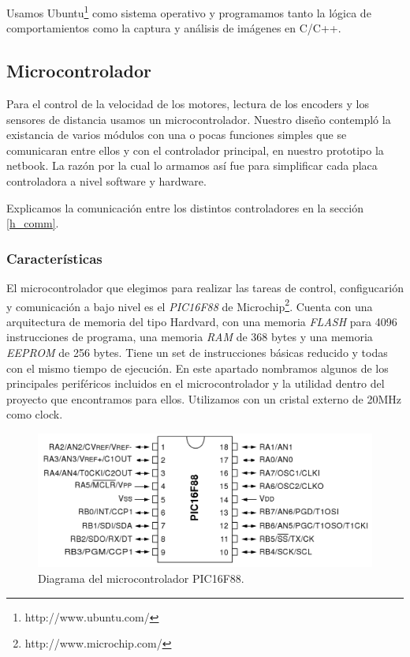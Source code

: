Usamos Ubuntu\footnote{http://www.ubuntu.com/} como sistema operativo y programamos tanto la l\'ogica de comportamientos
como la captura y an\'alisis de im\'agenes en C/C++.

\subsection{Microcontrolador}
\label{h_controlador_micro}

Para el control de la velocidad de los motores, lectura de los encoders y los sensores de distancia usamos un
microcontrolador.
Nuestro dise\~no contempl\'o la existancia de varios m\'odulos con una o pocas funciones simples que se comunicaran
entre ellos y con el controlador principal, en nuestro prototipo la netbook.
La raz\'on por la cual lo armamos as\'i fue para simplificar cada placa controladora a nivel software y hardware.

Explicamos la comunicaci\'on entre los distintos controladores en la secci\'on \ref{h_comm}.

\subsubsection{Caracter\'isticas}
\label{h_controlador_micro_caracteristicas}

El microcontrolador que elegimos para realizar las tareas de control, configucari\'on y comunicaci\'on a bajo nivel
es el \emph{PIC16F88} de Microchip\footnote{http://www.microchip.com/}.
Cuenta con una arquitectura de memoria del tipo Hardvard, con una memoria \emph{FLASH} para 4096 instrucciones de
programa, una memoria \emph{RAM} de 368 bytes y una memoria \emph{EEPROM} de 256 bytes.
Tiene un set de instrucciones b\'asicas reducido y todas con el mismo tiempo de ejecuci\'on.
En este apartado nombramos algunos de los principales perif\'ericos incluidos en el microcontrolador y la utilidad
dentro del proyecto que encontramos para ellos.
Utilizamos con un cristal externo de 20MHz como clock.

\begin{figure}[ht]
	\centering
	\includegraphics[scale=0.20]{figuras/pic16f88.png}
	\caption{Diagrama del microcontrolador PIC16F88.}
	\label{hF_pic16f88_diagrama}
\end{figure}

